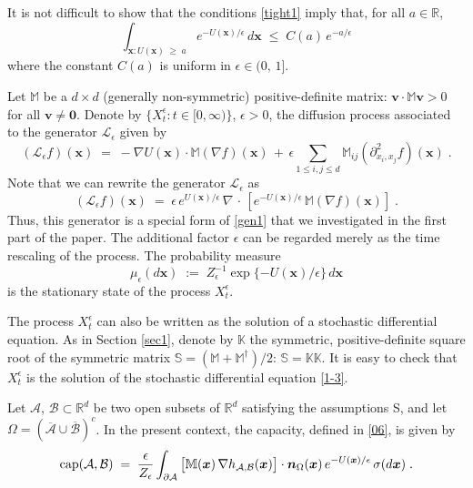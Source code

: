 \documentclass[reqno]{amsart}
\newcounter{as}[section]
\newcommand{\mc}[1]{{\mathcal #1}}
\newcommand{\bb}[1]{{\mathbb #1}}
\newcommand{\bs}[1]{{\boldsymbol #1}}
\newcommand{\<}{\langle}
\renewcommand{\>}{\rangle}
\renewcommand{\Cap}{{\rm cap}}
\begin{document}
It is not difficult to show that the conditions \eqref{tight1} imply
that, for all $a\in \bb R$,
\begin{equation}
\label{tight2}
\int_{\bs x:U(\bs x)\;\ge\; a}e^{-U(\bs x)/\epsilon} \, d\bs x \;\le\; C(a)\, e^{-a/\epsilon}
\end{equation}
where the constant $C(a)$ is uniform in $\epsilon\in(0,\,1]$.

\smallskip{} Let $\bb{M}$ be a $d\times
d$ (generally non-symmetric) positive-definite matrix:
$\bs{v}\cdot\bb{M}\bs{v}>0$ for all $\bs{v}\neq\bs{0}$. Denote by
$\{X_{t}^{\epsilon}:t\in[0,\infty)\}$, $\epsilon>0$, the diffusion
process associated to the generator $\mc{L}_{\epsilon}$ given by
\begin{equation*}
(\mc{L}_{\epsilon}f) (\bs{x})\;=\;-\nabla U(\bs{x}) \cdot \bb{M}
(\nabla f) (\bs{x}) \,+\,\epsilon\sum_{1\le i,j\le d}
\bb{M}_{ij} (\partial^2_{x_{i},x_{j}} f)(\bs{x})\;.
\end{equation*}
Note that we can rewrite the generator $\mc{L}_{\epsilon}$ as
\begin{equation*}
(\mc{L}_{\epsilon}f) (\bs{x})\;=\;\epsilon\,
e^{U(\bs{x})/\epsilon} \, \nabla\,\cdot\,
\left[e^{-U(\bs{x})/\epsilon} \, \bb{M} (\nabla f)(\bs{x})\right]\;.
\end{equation*}
Thus, this generator is a special form of \eqref{gen1} that we
investigated in the first part of the paper. The additional factor
$\epsilon$ can be regarded merely as the time rescaling of the
process. The probability measure
\begin{equation*}
\mu_{\epsilon}(d\bs{x})\;:=\;Z_{\epsilon}^{-1}\exp\{-U(\bs{x})/\epsilon\}\,
d\bs{x}
\end{equation*}
is the stationary state of the process $X_{t}^{\epsilon}$.

The process $X_{t}^{\epsilon}$ can also be written as the solution of
a stochastic differential equation. As in Section \ref{sec1}, denote
by $\bb{K}$ the symmetric, positive-definite square root of the
symmetric matrix $\bb{S}=(\bb{M}+\bb{M}^{\dagger})/2$: $\bb{S}=\bb K
\bb K$. It is easy to check that $X_{t}^{\epsilon}$ is the solution of
the stochastic differential equation \eqref{1-3}.

Let $\mc A$, $\mc B\subset\bb R^d$ be two open subsets of $\bb R^d$
satisfying the assumptions S, and let $\Omega = (\overline{\mc A}\cup
\overline{\mc B})^c$.  In the present context, the capacity, defined in
\eqref{06}, is given by
\begin{equation}
\label{7-16}
\Cap (\mc A, \mc B) \;=\; \frac{\epsilon}{Z_\epsilon}
\int_{\partial \mc A} \big[ \bb M(\bs x) \, \nabla
h_{\mc A, \mc B}(\bs x) \big] \cdot \bs n_{\Omega}(\bs x)
\, e^{-U(\bs x)/\epsilon} \, \sigma(d\bs x)\;.
\end{equation}
\end{document}
